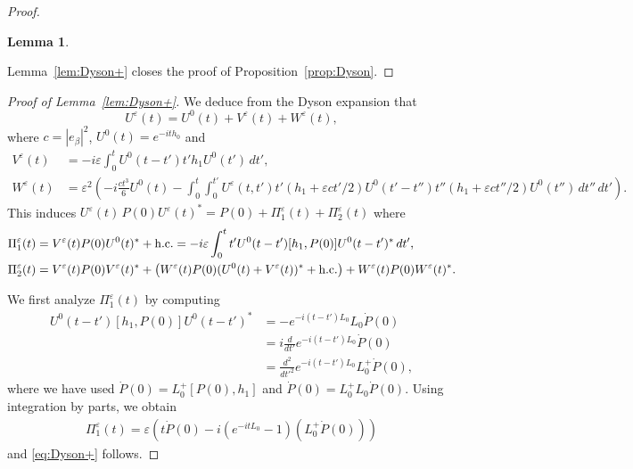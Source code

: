 \documentclass[a4paper,11pt]{article}
\theoremstyle{plain}
\newtheorem{lemma}[theorem]{Lemma}
\theoremstyle{remark}
\def\eps{{\varepsilon}}
\begin{document}
\begin{proof}[Proof]
\begin{lemma}
\end{lemma}

Lemma~\ref{lem:Dyson+} closes the proof of Proposition~\ref{prop:Dyson}.
\end{proof}


\begin{proof}[Proof of Lemma~\ref{lem:Dyson+}]
We deduce from the Dyson expansion that
$$
U^\eps(t)=U^0(t)+V^\eps(t)+W^\eps(t),
$$
where $c=|e_\beta|^2$, {$U^0(t)=e^{-ith_0}$} and
\begin{align*}
V^\eps(t) &= - i\eps \int_0^t U^0(t-t')  t' h_1 U^0(t') \, dt', \\
W^\eps(t) &=\eps^2\left(-i\frac{ct^3}{6}U^0(t)
-\int_0^t\int_0^{t'}U^\eps(t,t')t'(h_1+\eps ct'/2)
U^0(t'-t'')t''(h_1+\eps ct''/2)U^0(t'')\,dt''\,dt'\right).
\end{align*}
This induces $U^\eps(t)\, P(0) U^\eps(t)^* = P(0) + \Pi^\eps_1(t)+\Pi^\eps_2(t)$
where
\begin{align*}
\Pi^\eps_1(t)&=V^\eps(t)P(0)U^0(t)^* + {\rm h.c.} = - i\eps \int_0^t t' U^0(t-t')  [h_1,P(0)] U^0(t-t')^* \, dt', \\
\Pi^\eps_2(t)&=V^\eps(t)P(0)V^\eps(t)^* + \left( W^\eps(t) P(0) (U^0(t)+V^\eps(t))^* + {\rm h.c.} \right) + W^\eps(t)P(0)W^\eps(t)^*.
\end{align*}

\medskip

We first analyze $\Pi^\eps_1(t)$ by computing
\begin{align*}
  U^0(t-t') [h_1,P(0)] U^0(t-t')^* &= - e^{-i(t-t') L_{0}} L_{0} \dot P(0)\\
  &= i\frac{d}{dt'} e^{-i(t-t') L_{0}} \dot P(0)\\
  &= \frac{d^{2}}{dt'^{2}} e^{-i(t-t') L_{0}} L_{0}^{+}\dot P(0),
\end{align*}
where we have used $\dot P(0) = L_{0}^{+}[P(0),h_{1}]$ and
$\dot P(0) = L_{0}^{+} L_{0} \dot P(0)$. Using integration by parts, we obtain
\begin{align*}
  \Pi^{\eps}_{1}(t) = \eps \left(t \dot{P}(0) - i \left( e^{-itL_0}-1 \right) (L_0^+\dot{P}(0))\right)
\end{align*}
and \eqref{eq:Dyson+} follows.



\end{proof}
\end{document}
